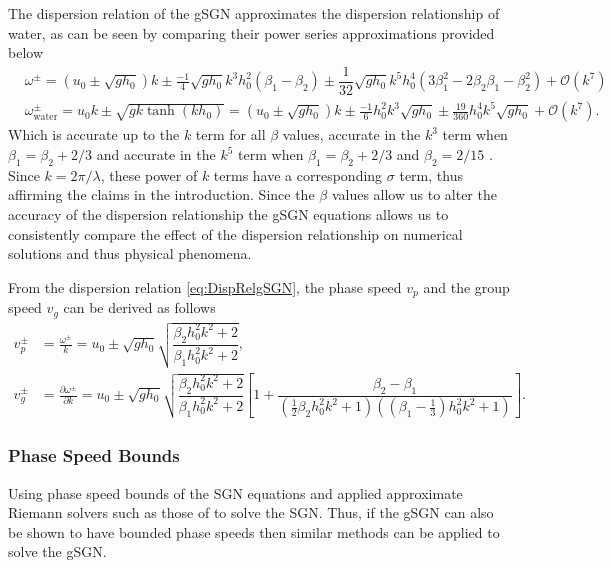\documentclass[10pt]{elsarticle}
\begin{document}
The dispersion relation of the gSGN approximates the dispersion relationship of water, as can be seen by comparing their power series approximations provided below
\begin{subequations}
\begin{align}
&\omega^\pm = \left(u_0 \pm \sqrt{gh_0}\right) k \pm  \frac{-1}{4}\sqrt{gh_0} k^3 h_0^2 \left(\beta_1 - \beta_2\right) \pm \dfrac{1}{32} \sqrt{gh_0} k^5 h_0^4\left(3 \beta_1^2 -  2 \beta_2 \beta_1 -\beta_2^2 \right) + \mathcal{O}\left(k^7\right) \\
&\omega^\pm_{\text{water}} = u_0 k \pm \sqrt{gk \tanh\left(k h_0\right)} = \left(u_0 \pm \sqrt{gh_0}\right) k \pm  \frac{-1}{6} h_0^2 k^3 \sqrt{gh_0} \pm \frac{19}{360} h_0^4 k^5 \sqrt{gh_0} + \mathcal{O}\left(k^7\right).
\end{align}
\label{eq:DispWaterPower}
\end{subequations}
Which is accurate up to the $k$ term for all $\beta$ values, accurate in the $k^3$ term when $\beta_1 = \beta_2 + 2/3$ and accurate in the $k^5$ term when $\beta_1 = \beta_2 + 2/3$ and $\beta_2 = 2/15$ \cite{Clamond-et.al-2017-245}. Since $k = 2\pi / \lambda$, these power of $k$ terms have a corresponding $\sigma$ term, thus affirming the claims in the introduction. Since the $\beta$ values allow us to alter the accuracy of the dispersion relationship the gSGN equations allows us to consistently compare the effect of the dispersion relationship on numerical solutions and thus physical phenomena. 


From the dispersion relation \eqref{eq:DispRelgSGN}, the phase speed $v_p$ and the group speed $v_g$ can be derived as follows
\begin{subequations}
\begin{align}
v^\pm_p &= \frac{\omega^\pm}{k} = u_0 \pm  \sqrt{gh_0} \sqrt{\dfrac{\beta_2 h_0^2 k^2 + 2}{\beta_1 h_0^2 k^2 + 2} },\\
v^\pm_g &= \frac{\partial \omega^\pm }{\partial k}= u_0  \pm  \sqrt{gh_0} \sqrt{\dfrac{\beta_2 h_0^2 k^2 + 2}{ \beta_1 h_0^2 k^2 + 2} } \left[1 +  \dfrac{\beta_2 - \beta_1 }{\left(\frac{1}{2}\beta_2 h_0^2 k^2 +1\right)\left( \left( \beta_1 - \frac{1}{3}\right) h_0^2 k^2 + 1\right)}\right].
\end{align}
\label{eq:wavespeeds}
\end{subequations}


\subsubsection{Phase Speed Bounds}
Using phase speed bounds of the SGN equations \citet{Hank-etal-2010-2034} and \citet{Zoppou-etal-2017} applied approximate Riemann solvers such as those of \citet{Kurganov-etal-2001-707} to solve the SGN. Thus, if the gSGN can also be shown to have bounded phase speeds then similar methods can be applied to solve the gSGN. 
\end{document}
